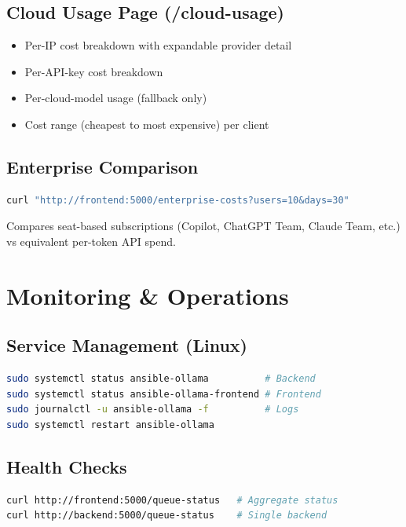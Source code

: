\documentclass[11pt,a4paper]{article}
\begin{document}
\subsection{Cloud Usage Page (/cloud-usage)}
\begin{itemize}
  \item Per-IP cost breakdown with expandable provider detail
  \item Per-API-key cost breakdown
  \item Per-cloud-model usage (fallback only)
  \item Cost range (cheapest to most expensive) per client
\end{itemize}

\subsection{Enterprise Comparison}
\begin{lstlisting}[language=bash]
curl "http://frontend:5000/enterprise-costs?users=10&days=30"
\end{lstlisting}
Compares seat-based subscriptions (Copilot, ChatGPT Team, Claude Team, etc.) vs equivalent per-token API spend.

\section{Monitoring \& Operations}

\subsection{Service Management (Linux)}
\begin{lstlisting}[language=bash]
sudo systemctl status ansible-ollama          # Backend
sudo systemctl status ansible-ollama-frontend # Frontend
sudo journalctl -u ansible-ollama -f          # Logs
sudo systemctl restart ansible-ollama
\end{lstlisting}

\subsection{Health Checks}
\begin{lstlisting}[language=bash]
curl http://frontend:5000/queue-status   # Aggregate status
curl http://backend:5000/queue-status    # Single backend
\end{lstlisting}
\end{document}
